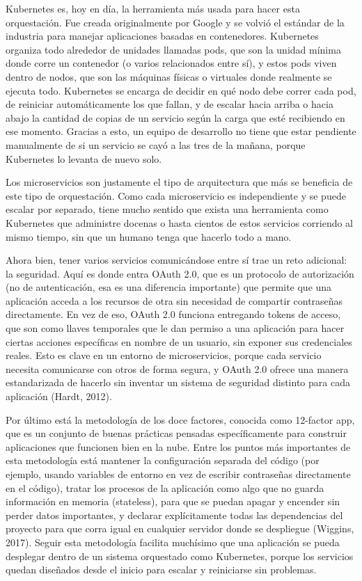 \documentclass[12pt,letterpaper]{article}
\begin{document}
Kubernetes es, hoy en día, la herramienta más usada para hacer esta orquestación. Fue creada originalmente por Google y se volvió el estándar de la industria para manejar aplicaciones basadas en contenedores. Kubernetes organiza todo alrededor de unidades llamadas pods, que son la unidad mínima donde corre un contenedor (o varios relacionados entre sí), y estos pods viven dentro de nodos, que son las máquinas físicas o virtuales donde realmente se ejecuta todo. Kubernetes se encarga de decidir en qué nodo debe correr cada pod, de reiniciar automáticamente los que fallan, y de escalar hacia arriba o hacia abajo la cantidad de copias de un servicio según la carga que esté recibiendo en ese momento. Gracias a esto, un equipo de desarrollo no tiene que estar pendiente manualmente de si un servicio se cayó a las tres de la mañana, porque Kubernetes lo levanta de nuevo solo.

Los microservicios son justamente el tipo de arquitectura que más se beneficia de este tipo de orquestación. Como cada microservicio es independiente y se puede escalar por separado, tiene mucho sentido que exista una herramienta como Kubernetes que administre docenas o hasta cientos de estos servicios corriendo al mismo tiempo, sin que un humano tenga que hacerlo todo a mano.

Ahora bien, tener varios servicios comunicándose entre sí trae un reto adicional: la seguridad. Aquí es donde entra OAuth 2.0, que es un protocolo de autorización (no de autenticación, esa es una diferencia importante) que permite que una aplicación acceda a los recursos de otra sin necesidad de compartir contraseñas directamente. En vez de eso, OAuth 2.0 funciona entregando tokens de acceso, que son como llaves temporales que le dan permiso a una aplicación para hacer ciertas acciones específicas en nombre de un usuario, sin exponer sus credenciales reales. Esto es clave en un entorno de microservicios, porque cada servicio necesita comunicarse con otros de forma segura, y OAuth 2.0 ofrece una manera estandarizada de hacerlo sin inventar un sistema de seguridad distinto para cada aplicación (Hardt, 2012).

Por último está la metodología de los doce factores, conocida como 12-factor app, que es un conjunto de buenas prácticas pensadas específicamente para construir aplicaciones que funcionen bien en la nube. Entre los puntos más importantes de esta metodología está mantener la configuración separada del código (por ejemplo, usando variables de entorno en vez de escribir contraseñas directamente en el código), tratar los procesos de la aplicación como algo que no guarda información en memoria (stateless), para que se puedan apagar y encender sin perder datos importantes, y declarar explícitamente todas las dependencias del proyecto para que corra igual en cualquier servidor donde se despliegue (Wiggins, 2017). Seguir esta metodología facilita muchísimo que una aplicación se pueda desplegar dentro de un sistema orquestado como Kubernetes, porque los servicios quedan diseñados desde el inicio para escalar y reiniciarse sin problemas.
\end{document}
